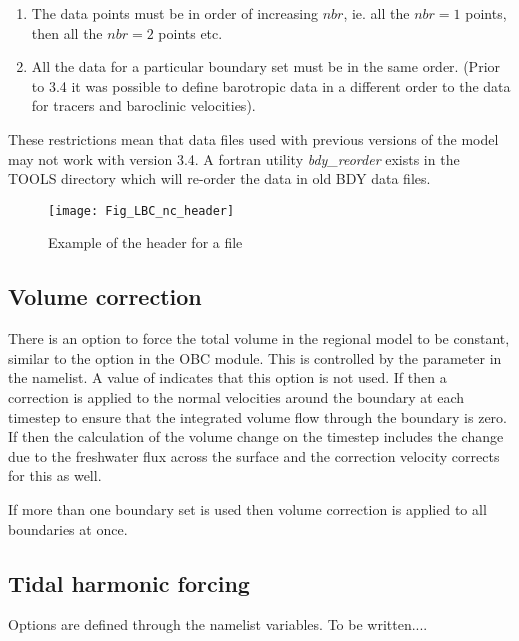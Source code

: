\documentclass[../tex_main/NEMO_manual]{subfiles}
\begin{document}
\mbox{}

\begin{enumerate}
\item The data points must be in order of increasing $nbr$,
  ie. all the $nbr=1$ points, then all the $nbr=2$ points etc.
\item All the data for a particular boundary set must be in the same order.
  (Prior to 3.4 it was possible to define barotropic data in a different order to
  the data for tracers and baroclinic velocities). 
\end{enumerate}

\mbox{}

These restrictions mean that data files used with previous versions of the model may not work with version 3.4.
A fortran utility {\it bdy\_reorder} exists in the TOOLS directory which
will re-order the data in old BDY data files. 

\begin{figure}[!t]     \begin{center}
\texttt{[image: Fig\_LBC\_nc\_header]}
\caption {     \protect\label{fig:LBC_nc_header}
  Example of the header for a \protect{} file}
\end{center}   \end{figure}

\subsection{Volume correction}
\label{subsec:BDY_vol_corr}

There is an option to force the total volume in the regional model to be constant,
similar to the option in the OBC module.
This is controlled  by the  parameter in the namelist.
A value of  indicates that this option is not used.
If  then a correction is applied to the normal velocities around the boundary at
each timestep to ensure that the integrated volume flow through the boundary is zero.
If  then the calculation of the volume change on
the timestep includes the change due to the freshwater flux across the surface and
the correction velocity corrects for this as well.

If more than one boundary set is used then volume correction is
applied to all boundaries at once.

\newpage
\subsection{Tidal harmonic forcing}
\label{subsec:BDY_tides}



Options are defined through the   namelist variables.
 To be written....
\end{document}
